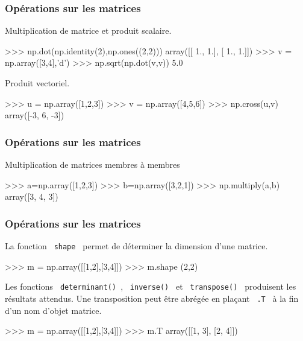 \begin{frame}[fragile]
\frametitle{Opérations sur les matrices}

Multiplication de matrice et produit scalaire.

\begin{GrayBox}[0.85\textwidth]
\begin{verbatimtab}[3]
>>> np.dot(np.identity(2),np.ones((2,2)))
array([[ 1.,  1.],
       [ 1.,  1.]])
>>> v = np.array([3,4],'d')
>>> np.sqrt(np.dot(v,v))
5.0
\end{verbatimtab}
\end{GrayBox}

Produit vectoriel.

\begin{GrayBox}[0.85\textwidth]
\begin{verbatimtab}[3]
>>> u = np.array([1,2,3])
>>> v = np.array([4,5,6])
>>> np.cross(u,v)	
array([-3,  6, -3])
\end{verbatimtab}
\end{GrayBox}

\end{frame}

\begin{frame}[fragile]
\frametitle{Opérations sur les matrices}

Multiplication de matrices membres à membres

\begin{GrayBox}[0.85\textwidth]
\begin{verbatimtab}[3]
>>> a=np.array([1,2,3])
>>> b=np.array([3,2,1])
>>> np.multiply(a,b)
array([3, 4, 3])
\end{verbatimtab}
\end{GrayBox}

\end{frame}

\begin{frame}[fragile]
\frametitle{Opérations sur les matrices}

La fonction \verb? shape ? permet de déterminer la dimension d'une matrice.

\begin{GrayBox}[0.85\textwidth]
\begin{verbatimtab}[3]
>>> m = np.array([[1,2],[3,4]])
>>> m.shape
(2,2)
\end{verbatimtab}
\end{GrayBox}

Les fonctions \verb? determinant() ?, \verb? inverse() ? et \verb? transpose() ? produisent les résultats attendus. Une transposition peut être abrégée en plaçant \verb? .T ? à la fin d'un nom d'objet matrice.

\begin{GrayBox}[0.85\textwidth]
\begin{verbatimtab}[3]
>>> m = np.array([[1,2],[3,4]])
>>> m.T
array([[1, 3],
       [2, 4]])
\end{verbatimtab}
\end{GrayBox}

\end{frame}

